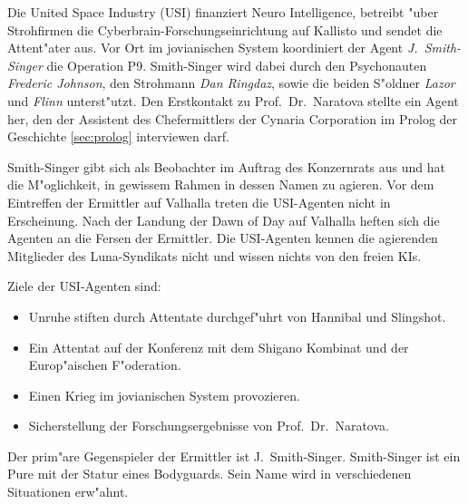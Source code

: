 
Die United Space Industry (USI) finanziert Neuro Intelligence, betreibt "uber Strohfirmen die Cyberbrain-Forschungseinrichtung auf Kallisto und sendet die Attent"ater aus. Vor Ort im jovianischen System koordiniert der Agent \emph{J.~Smith-Singer} die Operation P9. Smith-Singer wird dabei durch den Psychonauten \emph{Frederic Johnson}, den Strohmann \emph{Dan Ringdaz}, sowie die beiden S"oldner \emph{Lazor} und \emph{Flinn} unterst"utzt. Den Erstkontakt zu Prof.~Dr.~Naratova stellte ein Agent her, den der Assistent des Chefermittlers der Cynaria Corporation im Prolog der Geschichte \cref{sec:prolog} interviewen darf.

Smith-Singer gibt sich als Beobachter im Auftrag des Konzernrats aus und hat die M"oglichkeit, in gewissem Rahmen in dessen Namen zu agieren. Vor dem Eintreffen der Ermittler auf Valhalla treten die USI-Agenten nicht in Erscheinung. Nach der Landung der Dawn of Day auf Valhalla heften sich die Agenten an die Fersen der Ermittler. Die USI-Agenten kennen die agierenden Mitglieder des Luna-Syndikats nicht und wissen nichts von den freien KIs.

Ziele der USI-Agenten sind:

\begin{itemize}
    \item Unruhe stiften durch Attentate durchgef"uhrt von Hannibal und Slingshot.
    \item Ein Attentat auf der Konferenz mit dem Shigano Kombinat und der Europ"aischen F"oderation.
    \item Einen Krieg im jovianischen System provozieren.
    \item Sicherstellung der Forschungsergebnisse von  Prof.~Dr.~Naratova.
\end{itemize}

Der prim"are Gegenspieler der Ermittler ist J.~Smith-Singer. Smith-Singer ist ein Pure mit der Statur eines Bodyguards. Sein Name wird in verschiedenen Situationen erw"ahnt.


